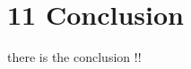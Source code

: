 \chapter*{11    Conclusion}
\setcounter{chapter}{11}
\setcounter{section}{0}

there is the conclusion !!
